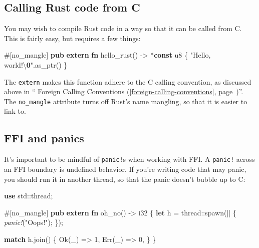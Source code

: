\documentclass[a4paper,]{book}
\renewcommand*{\hyperref}[2][\ar]{%
  \def\ar{#2}%
  #2 (\autoref{#1}, page~\pageref{#1})}
\newenvironment{Shaded}{\begin{snugshade}}{\end{snugshade}}
\newcommand{\KeywordTok}[1]{\textcolor[rgb]{0.13,0.29,0.53}{\textbf{{#1}}}}
\newcommand{\DataTypeTok}[1]{\textcolor[rgb]{0.13,0.29,0.53}{{#1}}}
\newcommand{\DecValTok}[1]{\textcolor[rgb]{0.00,0.00,0.81}{{#1}}}
\newcommand{\ConstantTok}[1]{\textcolor[rgb]{0.00,0.00,0.00}{{#1}}}
\newcommand{\SpecialCharTok}[1]{\textcolor[rgb]{0.00,0.00,0.00}{{#1}}}
\newcommand{\StringTok}[1]{\textcolor[rgb]{0.31,0.60,0.02}{{#1}}}
\newcommand{\PreprocessorTok}[1]{\textcolor[rgb]{0.56,0.35,0.01}{\textit{{#1}}}}
\newcommand{\AttributeTok}[1]{\textcolor[rgb]{0.77,0.63,0.00}{{#1}}}
\newcommand{\ErrorTok}[1]{\textcolor[rgb]{0.64,0.00,0.00}{\textbf{{#1}}}}
\newcommand{\NormalTok}[1]{{#1}}
\begin{document}
\subsection{Calling Rust code from C}\label{calling-rust-code-from-c}

You may wish to compile Rust code in a way so that it can be called from
C. This is fairly easy, but requires a few things:

\begin{Shaded}
\begin{Highlighting}[]
\AttributeTok{#[}\NormalTok{no_mangle}\AttributeTok{]}
\KeywordTok{pub} \KeywordTok{extern} \KeywordTok{fn} \NormalTok{hello_rust() -> *}\KeywordTok{const} \DataTypeTok{u8} \NormalTok{\{}
    \StringTok{"Hello, world!}\SpecialCharTok{\textbackslash{}}\ErrorTok{0}\StringTok{"}\NormalTok{.as_ptr()}
\NormalTok{\}}
\end{Highlighting}
\end{Shaded}

The \texttt{extern} makes this function adhere to the C calling
convention, as discussed above in
``\hyperref[foreign-calling-conventions]{Foreign Calling Conventions}''.
The \texttt{no\_mangle} attribute turns off Rust's name mangling, so
that it is easier to link to.

\subsection{FFI and panics}\label{ffi-and-panics}

It's important to be mindful of \texttt{panic!}s when working with FFI.
A \texttt{panic!} across an FFI boundary is undefined behavior. If
you're writing code that may panic, you should run it in another thread,
so that the panic doesn't bubble up to C:

\begin{Shaded}
\begin{Highlighting}[]
\KeywordTok{use} \NormalTok{std::thread;}

\AttributeTok{#[}\NormalTok{no_mangle}\AttributeTok{]}
\KeywordTok{pub} \KeywordTok{extern} \KeywordTok{fn} \NormalTok{oh_no() -> }\DataTypeTok{i32} \NormalTok{\{}
    \KeywordTok{let} \NormalTok{h = thread::spawn(|| \{}
        \PreprocessorTok{panic!}\NormalTok{(}\StringTok{"Oops!"}\NormalTok{);}
    \NormalTok{\});}

    \KeywordTok{match} \NormalTok{h.join() \{}
        \ConstantTok{Ok}\NormalTok{(_) => }\DecValTok{1}\NormalTok{,}
        \ConstantTok{Err}\NormalTok{(_) => }\DecValTok{0}\NormalTok{,}
    \NormalTok{\}}
\NormalTok{\}}
\end{Highlighting}
\end{Shaded}
\end{document}
